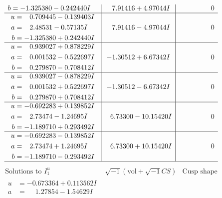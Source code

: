 \documentclass[1p]{elsarticle_modified}
\theoremstyle{definition}
\newcommand{\I}{\sqrt{-1}}
\begin{document}
$$\begin{array}{c|c|c}
\begin{aligned}
b &= -1.325380 - 0.242440 I\end{aligned}
 & \phantom{-}7.91416 + 4.97044 I & \phantom{-0.000000 } 0 \\ \hline\begin{aligned}
u &= \phantom{-}0.709445 - 0.139403 I \\
a &= \phantom{-}2.48531 - 0.57135 I \\
b &= -1.325380 + 0.242440 I\end{aligned}
 & \phantom{-}7.91416 - 4.97044 I & \phantom{-0.000000 } 0 \\ \hline\begin{aligned}
u &= \phantom{-}0.939027 + 0.878229 I \\
a &= \phantom{-}0.001532 - 0.522697 I \\
b &= \phantom{-}0.279870 - 0.708412 I\end{aligned}
 & -1.30512 + 6.67342 I & \phantom{-0.000000 } 0 \\ \hline\begin{aligned}
u &= \phantom{-}0.939027 - 0.878229 I \\
a &= \phantom{-}0.001532 + 0.522697 I \\
b &= \phantom{-}0.279870 + 0.708412 I\end{aligned}
 & -1.30512 - 6.67342 I & \phantom{-0.000000 } 0 \\ \hline\begin{aligned}
u &= -0.692283 + 0.139852 I \\
a &= \phantom{-}2.73474 - 1.24695 I \\
b &= -1.189710 + 0.293492 I\end{aligned}
 & \phantom{-}6.73300 - 10.15420 I & \phantom{-0.000000 } 0 \\ \hline\begin{aligned}
u &= -0.692283 - 0.139852 I \\
a &= \phantom{-}2.73474 + 1.24695 I \\
b &= -1.189710 - 0.293492 I\end{aligned}
 & \phantom{-}6.73300 + 10.15420 I & \phantom{-0.000000 } 0\\
 \hline 
 \end{array}$$\newpage$$\begin{array}{c|c|c}  
\text{Solutions to }I^u_{1}& \I (\text{vol} + \sqrt{-1}CS) & \text{Cusp shape}\\
 \hline 
\begin{aligned}
u &= -0.673364 + 0.113562 I \\
a &= \phantom{-}1.27854 - 1.54629 I \\

\end{aligned}
\end{array}$$
\end{document}
